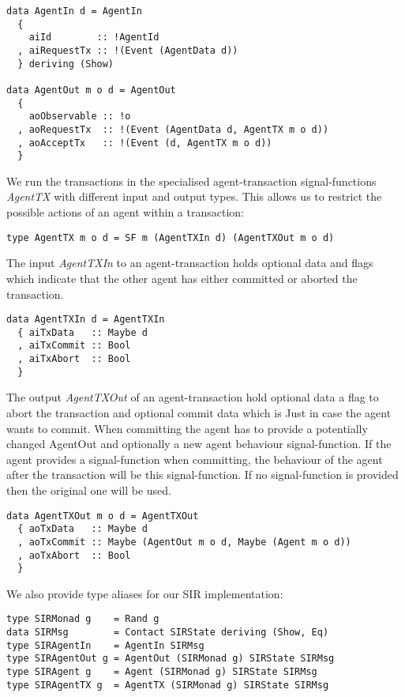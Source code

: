 \begin{verbatim}
data AgentIn d = AgentIn
  {
    aiId        :: !AgentId
  , aiRequestTx :: !(Event (AgentData d))
  } deriving (Show)

data AgentOut m o d = AgentOut
  {
    aoObservable :: !o
  , aoRequestTx  :: !(Event (AgentData d, AgentTX m o d))
  , aoAcceptTx   :: !(Event (d, AgentTX m o d))
  }
\end{verbatim}

We run the transactions in the specialised agent-transaction signal-functions \textit{AgentTX} with different input and output types. This allows us to restrict the possible actions of an agent within a transaction:

\begin{verbatim}
type AgentTX m o d = SF m (AgentTXIn d) (AgentTXOut m o d)
\end{verbatim}

The input \textit{AgentTXIn} to an agent-transaction holds optional data and flags which indicate that the other agent has either committed or aborted the transaction.

\begin{verbatim}
data AgentTXIn d = AgentTXIn
  { aiTxData   :: Maybe d
  , aiTxCommit :: Bool
  , aiTxAbort  :: Bool
  }
\end{verbatim}

The output \textit{AgentTXOut} of an agent-transaction hold optional data a flag to abort the transaction and optional commit data which is Just in case the agent wants to commit. When committing the agent has to provide a potentially changed AgentOut and optionally a new agent behaviour signal-function. If the agent provides a signal-function when committing, the behaviour of the agent after the transaction will be this signal-function. If no signal-function is provided then the original one will be used.

\begin{verbatim}
data AgentTXOut m o d = AgentTXOut
  { aoTxData   :: Maybe d
  , aoTxCommit :: Maybe (AgentOut m o d, Maybe (Agent m o d))
  , aoTxAbort  :: Bool
  }
\end{verbatim}

We also provide type aliases for our SIR implementation:
\begin{verbatim}
type SIRMonad g    = Rand g
data SIRMsg        = Contact SIRState deriving (Show, Eq)
type SIRAgentIn    = AgentIn SIRMsg
type SIRAgentOut g = AgentOut (SIRMonad g) SIRState SIRMsg
type SIRAgent g    = Agent (SIRMonad g) SIRState SIRMsg
type SIRAgentTX g  = AgentTX (SIRMonad g) SIRState SIRMsg
\end{verbatim}

